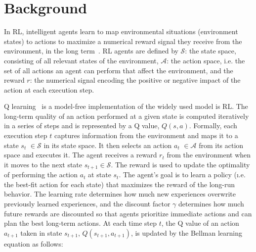 
\section{Background}
\label{sec:background}

In \ac{RL}, intelligent agents learn to map environmental situations (environment states) to actions to maximize a numerical reward signal they receive from the environment, in the long term~\cite{sutton18}. \ac{RL} agents are defined by
$\mathcal{S}$: the state space, consisting of all relevant states of the environment,
$\mathcal{A}$: the action space, i.e. the set of all actions an agent can perform that affect the environment, and the reward $r$: the numerical signal encoding the positive or negative impact of the action at each execution step.

Q learning~\cite{watkins92} is a model-free implementation of the widely used model
is \ac{RL}. The long-term quality of an action performed at a given state is computed iteratively in a series of steps and is represented by a Q value,
$\mathit{Q(s,a)}$.
Formally, each execution step $t$ captures information from the environment and maps it to a state
{\color{purple}$s_t$} $\in \mathcal{S}$ in its state space. It then selects an
action {\color{purple}$a_t$} $\in \mathcal{A}$ from its action space and executes it. The agent
receives a reward {\color{Bittersweet}$r_t$} from the environment when it moves to the next state
$s_{t+1} \in \mathcal{S}$. The reward is used to update the optimality of performing the
action {\color{Mulberry}$a_t$} at state {\color{purple}$s_t$}. The agent's goal is to learn
a policy (\i.e. the best-fit action for each state) that maximizes the reward of the
long-run behavior. The learning rate \lrate{\alpha} determines how much new experiences 
overwrite previously learned experiences, and the discount factor {\color{RoyalBlue} $\gamma$} 
determines how much future rewards are discounted so that agents prioritize immediate actions and 
can plan the best long-term actions. At each time step $t$, the Q value of an action 
{\color{purple}$a_{t+1}$} taken in state {\color{purple}$s_{t+1}$}, $Q(s_{t+1}, a_{t+1})$, is updated by 
the Bellman learning equation as follows:

\vspace{1em}




\endinput

